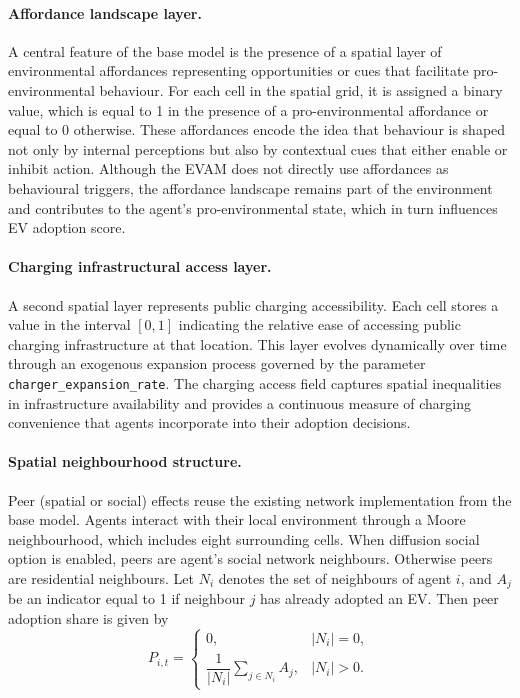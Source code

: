 \documentclass[11pt]{article}
\begin{document}
\paragraph{Affordance landscape layer.} A central feature of the base model
is the presence of a spatial layer of environmental affordances representing
opportunities or cues that facilitate pro-environmental behaviour. For each
cell in the spatial grid, it is assigned a binary value, which is equal to 1
in the presence of a pro-environmental affordance or equal to 0 otherwise.
These affordances encode the idea that behaviour is shaped not only by
internal perceptions but also by contextual cues that either enable or
inhibit action. Although the EVAM does not directly use affordances as
behavioural triggers, the affordance landscape remains part of the
environment and contributes to the agent's pro-environmental state, which in
turn influences EV adoption score.

\paragraph{Charging infrastructural access layer.} A second spatial layer
represents public charging accessibility. Each cell stores a value in the
interval $[0,1]$ indicating the relative ease of accessing public charging
infrastructure at that location. This layer evolves dynamically over time
through an exogenous expansion process governed by the parameter
\texttt{charger\_expansion\_rate}. The charging access field captures
spatial inequalities in infrastructure availability and provides a
continuous measure of charging convenience that agents incorporate into
their adoption decisions.

\paragraph{Spatial neighbourhood structure.} Peer (spatial or social)
effects reuse the existing network implementation from the base model.
Agents interact with their local environment through a Moore neighbourhood,
which includes eight surrounding cells. When diffusion social option is
enabled, peers are agent's social network neighbours. Otherwise peers are
residential neighbours. Let $N_i$ denotes the set of neighbours of agent
$i$, and $A_j$ be an indicator equal to 1 if neighbour $j$ has already
adopted an EV. Then peer adoption share is given by
\begin{equation}
P_{i,t} =
\begin{cases}
0, & |N_i| = 0,\\[2pt]
\dfrac{1}{|N_i|}\sum_{j\in N_i} A_j, & |N_i| > 0.
\end{cases}
\end{equation}
\end{document}
